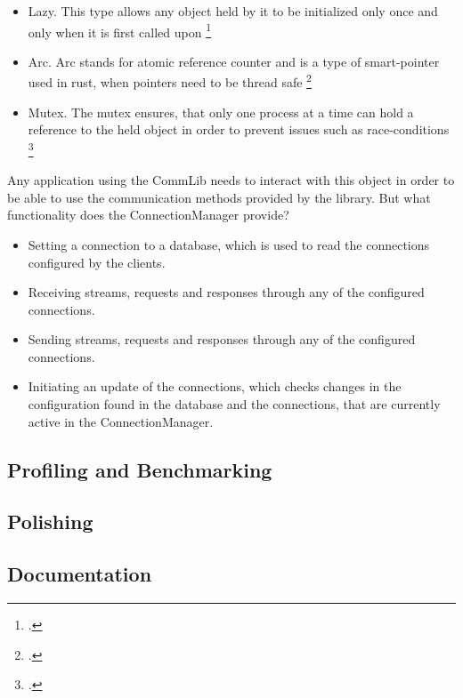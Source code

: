 \begin{itemize}
	\item Lazy. This type allows any object held by it to be initialized only once and only when it is first called upon \footcite{once-cell-lazy}
	\item Arc. Arc stands for atomic reference counter and is a type of smart-pointer used in rust, when pointers need to be thread safe \footcite{rust-arc}
	\item Mutex. The mutex ensures, that only one process at a time can hold a reference to the held object in order to prevent issues such as race-conditions \footcite{tokio-mutex}
\end{itemize}

Any application using the CommLib needs to interact with this object in order to be able to use the communication methods provided by the library. But what functionality does the ConnectionManager provide?

\begin{itemize}
	\item Setting a connection to a database, which is used to read the connections configured by the clients.
	\item Receiving streams, requests and responses through any of the configured connections.
	\item Sending streams, requests and responses through any of the configured connections.
	\item Initiating an update of the connections, which checks changes in the configuration found in the database and the connections, that are currently active in the ConnectionManager.
\end{itemize}


\subsection{Profiling and Benchmarking}

\subsection{Polishing}

\subsection{Documentation}


